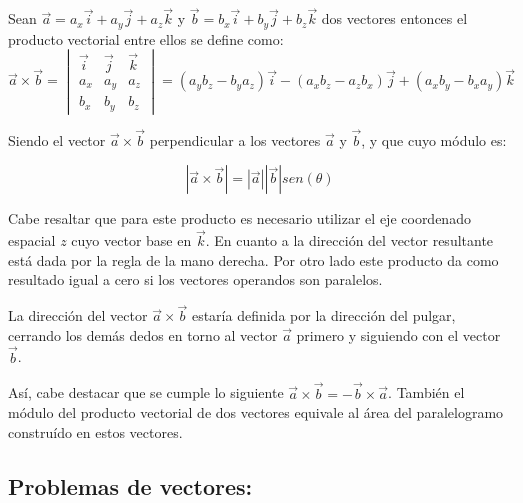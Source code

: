 \documentclass[a5paper,pagesize,10pt,bibtotoc,pointlessnumbers,
normalheadings,DIV=9,fleqn,x11names,table,twoside=false]{scrbook}
\begin{document}
\begin{tcolorbox}
 Sean $\vec{a} =a_x\vec{i}+a_y\vec{j}+a_z\vec{k}$ y $\vec{b}=b_x\vec{i}+b_y\vec{j}+b_z\vec{k}$ dos vectores entonces el 
 producto vectorial entre ellos se define como: 
\scriptsize{ 
 \[
\vec{a}\times\vec{b} =
\begin{vmatrix}
\vec{i} & \vec{j} & \vec{k} \\ 
a_x & a_y & a_z \\
b_x & b_y & b_z
\end{vmatrix} = (a_yb_z-b_ya_z)\vec{i}-(a_xb_z-a_zb_x)\vec{j}+(a_xb_y-b_xa_y)\vec{k}
\]}
\end{tcolorbox}

Siendo el vector $\vec{a}\times\vec{b}$ perpendicular a los vectores $\vec{a}$ y $\vec{b}$, y que cuyo módulo es:

\begin{equation}
 |\vec{a}\times\vec{b}|=|\vec{a}||\vec{b}|sen(\theta)
\end{equation}

Cabe resaltar que para este producto es necesario utilizar el eje coordenado espacial $z$ cuyo vector base en 
$\vec{k}$. En cuanto a la dirección del vector resultante está dada por la regla de la mano derecha. Por otro lado este 
producto da como resultado igual a cero si los vectores operandos son paralelos.

\begin{tcolorbox}
La dirección del vector $\vec{a}\times\vec{b}$ estaría definida por la dirección del pulgar, cerrando los demás dedos en torno al 
vector $\vec{a}$ primero y siguiendo con el vector $\vec{b}$.
\end{tcolorbox}

Así, cabe destacar que se cumple lo siguiente $\vec{a}\times\vec{b}=-\vec{b}\times\vec{a}$. También el módulo del producto 
vectorial de dos vectores equivale al área del paralelogramo construído en estos vectores.

\subsection{Problemas de vectores:}
\end{document}
